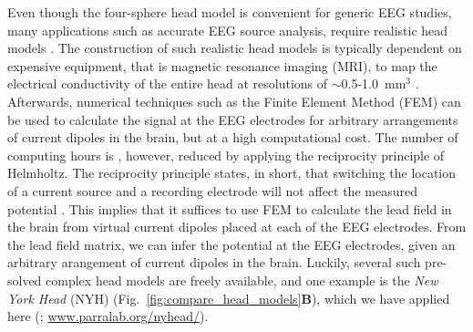 \documentclass[preprint,10pt,authoryear]{elsarticle}
\newcommand{\hlb}[2][NavyBlue]{ {\sethlcolor{#1} \hl{#2}} }
\newcommand{\hlg}[2][Emerald]{ {\sethlcolor{#1} \hl{#2}} }
\newcommand{\snnote}[1]{\color{white}{\hlb{SN: #1 }}\color{black}}
\newcommand{\sntxt}[1]{{\color{NavyBlue}#1}}
\newcommand{\tvnnote}[1]{\color{white}{\hlg{TVN: #1 }}\color{black}}
\begin{document}
Even though the four-sphere head model is convenient for generic EEG studies, many applications such as accurate EEG source analysis, require realistic head models \citep{DALE1999, VORWERK2014}.
The construction of such realistic head models is typically dependent on expensive equipment, %
that is magnetic resonance imaging (MRI), to map the electrical conductivity of the entire head at resolutions of $\sim$0.5-1.0~mm$^3$
\citep{HUANG2015, HUANG2016}. Afterwards, numerical techniques such as the Finite Element Method (FEM) \citep{LOGG2012} can be used to calculate the signal at the EEG electrodes for arbitrary arrangements of current dipoles in the brain, but at a high computational cost.
The number of computing hours is
, however, reduced by applying the reciprocity principle of Helmholtz. The reciprocity principle states, in short, that switching the location of a current source and a recording electrode will not affect the measured potential \citep{Malmivuo1995, Ziegler2014, HUANG2016, Dmochowski2017}. This implies that it suffices to use FEM to calculate the lead field in the brain from virtual current dipoles placed at each of the EEG electrodes. From the lead field matrix, we can infer the potential at the EEG electrodes, given an arbitrary arangement of current dipoles in the brain.
Luckily, several such pre-solved complex head models are freely available, and one example is the {\it New York Head} (NYH) (Fig.~\ref{fig:compare_head_models}\textbf{B}), which we have applied here (\cite{HUANG2016}; \url{www.parralab.org/nyhead/}).
\end{document}
